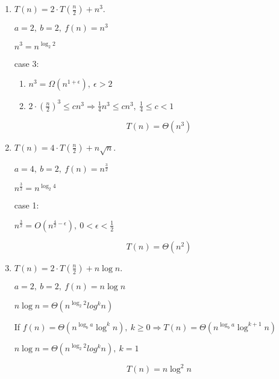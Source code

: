\documentclass[11pt]{article}
\begin{document}
\begin{enumerate}
\begin{enumerate}
\item
$T(n)=2\cdot T(\frac{n}{2})+ n^3$.

$a=2,\ b=2,\ f(n)=n^3$

$n^3 = n^{\log_2{2}}$


case 3:
\begin{enumerate}

  \item
    $n^3 = \Omega(n^{1+\epsilon}),\ \epsilon > 2$

  \item
    $2\cdot\left(\frac{n}{2}\right)^3 \leq cn^3\Rightarrow \frac{1}{4}n^3\leq cn^3 ,\ \frac{1}{4}\leq c < 1 $

\end{enumerate}

\[\boxed{T(n) = \Theta\left(n^3 \right)}\]

\item
$T(n)=4\cdot T(\frac{n}{2})+n\sqrt{n}$.

$a=4,\ b=2,\ f(n)=n^{\frac{3}{2}}$

$n^{\frac{3}{2}} = n^{\log_2 4}$

case 1:

$n^{\frac{3}{2}} = O\left(n^{\frac{4}{2}-\epsilon}\right),\ 0 < \epsilon < \frac{1}{2}$

\[\boxed{T(n) = \Theta\left(n^2 \right)}\]


\item
$T(n)=2\cdot T(\frac{n}{2})+n\log n$.

$a=2,\ b=2,\ f(n)=n\log n$

$n\log n = \Theta(n^{\log_2 2} log^k n)$

If $f(n)=\Theta (n^{\log_{b}a}\log^{k}n),\ k \geq 0 \Rightarrow T(n)=\Theta (n^{\log_{b}a}\log^{k+1}n)$

$n\log n = \Theta(n^{\log_2 2} log^k n),\ k=1$

\[\boxed{T(n)=n\log^2 n}\]



%
%
%
%
%
%
%
%


\end{enumerate}
\end{enumerate}
\end{document}
